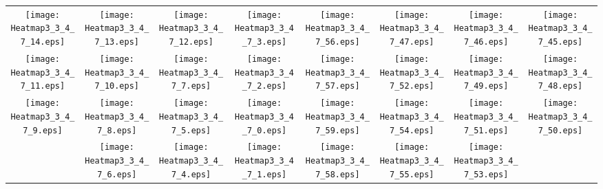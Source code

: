 \documentclass{standalone}
\begin{document}
\begin{tabular}{ *8{c} }
\texttt{[image: Heatmap3\_3\_4\_7\_14.eps]} & \texttt{[image: Heatmap3\_3\_4\_7\_13.eps]} & \texttt{[image: Heatmap3\_3\_4\_7\_12.eps]} & \texttt{[image: Heatmap3\_3\_4\_7\_3.eps]} & \texttt{[image: Heatmap3\_3\_4\_7\_56.eps]} & \texttt{[image: Heatmap3\_3\_4\_7\_47.eps]} & \texttt{[image: Heatmap3\_3\_4\_7\_46.eps]} & \texttt{[image: Heatmap3\_3\_4\_7\_45.eps]} \\
\texttt{[image: Heatmap3\_3\_4\_7\_11.eps]} & \texttt{[image: Heatmap3\_3\_4\_7\_10.eps]} & \texttt{[image: Heatmap3\_3\_4\_7\_7.eps]} & \texttt{[image: Heatmap3\_3\_4\_7\_2.eps]} & \texttt{[image: Heatmap3\_3\_4\_7\_57.eps]} & \texttt{[image: Heatmap3\_3\_4\_7\_52.eps]} & \texttt{[image: Heatmap3\_3\_4\_7\_49.eps]} & \texttt{[image: Heatmap3\_3\_4\_7\_48.eps]} \\
\texttt{[image: Heatmap3\_3\_4\_7\_9.eps]} & \texttt{[image: Heatmap3\_3\_4\_7\_8.eps]} & \texttt{[image: Heatmap3\_3\_4\_7\_5.eps]} & \texttt{[image: Heatmap3\_3\_4\_7\_0.eps]} & \texttt{[image: Heatmap3\_3\_4\_7\_59.eps]} & \texttt{[image: Heatmap3\_3\_4\_7\_54.eps]} & \texttt{[image: Heatmap3\_3\_4\_7\_51.eps]} & \texttt{[image: Heatmap3\_3\_4\_7\_50.eps]} \\
 & \texttt{[image: Heatmap3\_3\_4\_7\_6.eps]} & \texttt{[image: Heatmap3\_3\_4\_7\_4.eps]} & \texttt{[image: Heatmap3\_3\_4\_7\_1.eps]} & \texttt{[image: Heatmap3\_3\_4\_7\_58.eps]} & \texttt{[image: Heatmap3\_3\_4\_7\_55.eps]} & \texttt{[image: Heatmap3\_3\_4\_7\_53.eps]} &  
\end{tabular}
\end{document}
